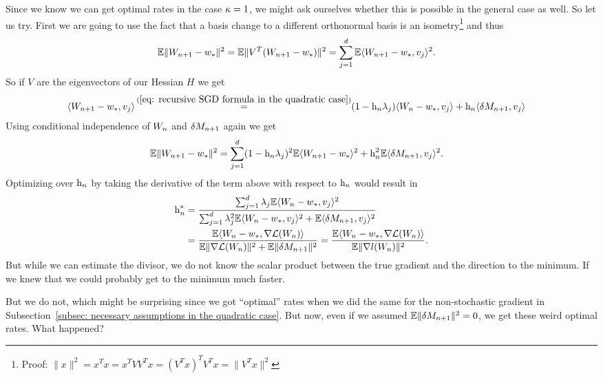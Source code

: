 Since we know we can get optimal rates in the case \(\kappa=1\), we might
ask ourselves whether this is possible in the general case as well. So let us
try. First we are going to use the fact that a basis change to a different
orthonormal basis is an isometry\footnote{
	Proof: \(\|x\|^2 = x^Tx = x^TVV^Tx = (V^T x)^T V^Tx = \|V^T x\|^2\)
}
and thus
\begin{align*}
	\mathbb{E}\|W_{n+1} - w_*\|^2
	&= \mathbb{E}\|V^T(W_{n+1} - w_*)\|^2
	= \sum_{j=1}^d \mathbb{E}\langle W_{n+1}-w_*, v_j\rangle^2.
\end{align*}
So if \(V\) are the eigenvectors of our Hessian \(H\) we get
\begin{align*}
	\langle \Weights_{n+1}-\minimum, v_j \rangle
	&\xeq{(\ref{eq: recursive SGD formula in the quadratic case})} (1-\lr_n\lambda_j)\langle\Weights_n-\minimum, v_j\rangle
	+ \lr_n\langle\martIncr_{n+1},v_j\rangle
\end{align*}
Using conditional independence of \(W_n\) and \(\delta M_{n+1}\) again we get
\begin{align}
	\label{eq: expected square error in quadratic case}
	\mathbb{E}\|W_{n+1} - w_*\|^2
	&= \sum_{j=1}^d (1-\text{h}_n \lambda_j)^2 \mathbb{E}\langle W_{n+1}-w_*\rangle^2
	+ \text{h}_n^2 \mathbb{E}\langle \delta M_{n+1}, v_j\rangle^2.
\end{align}
Optimizing over \(\text{h}_n\) by taking the derivative of the term above with
respect to \(\text{h}_n\) would result in
\begin{align*}
	\text{h}_n^* &= \frac{
		\sum_{j=1}^d \lambda_j \mathbb{E}\langle W_n-w_*, v_j\rangle^2
	}{
		\sum_{j=1}^d\lambda_j^2\mathbb{E}\langle W_n-w_*, v_j\rangle^2
		+ \mathbb{E}\langle\delta M_{n+1}, v_j\rangle^2
	}\\
	&= \frac{
		\mathbb{E}\langle W_n - w_*, \nabla\mathcal{L}(W_n)\rangle
	}{
		\mathbb{E}\|\nabla\mathcal{L}(W_n)\|^2 + \mathbb{E}\|\delta M_{n+1}\|^2
	}
	= \frac{
		\mathbb{E}\langle W_n - w_*, \nabla\mathcal{L}(W_n)\rangle
	}{
		\mathbb{E}\|\nabla l(W_n)\|^2
	}.
\end{align*}
But while we can estimate the divisor, we do not know the scalar product between
the true gradient and the direction to the minimum. If we knew that we could
probably get to the minimum much faster.

But we do not, which might be surprising since we got ``optimal'' rates when
we did the same for the non-stochastic gradient in Subsection~\ref{subsec:
necessary assumptions in the quadratic case}. But now, even if we assumed
\(\mathbb{E}\|\delta M_{n+1}\|^2=0\), we get these weird optimal rates. What happened?

